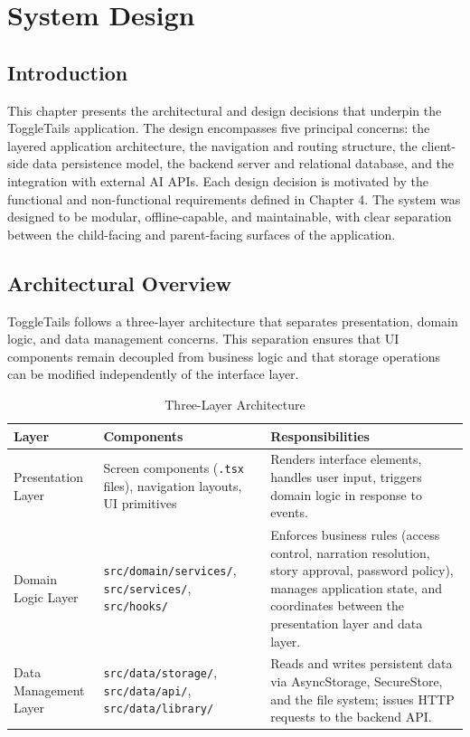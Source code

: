 \chapter{System Design}

\section{Introduction}

This chapter presents the architectural and design decisions that underpin the ToggleTails application. The design encompasses five principal concerns: the layered application architecture, the navigation and routing structure, the client-side data persistence model, the backend server and relational database, and the integration with external AI APIs. Each design decision is motivated by the functional and non-functional requirements defined in Chapter 4. The system was designed to be modular, offline-capable, and maintainable, with clear separation between the child-facing and parent-facing surfaces of the application.

\section{Architectural Overview}

ToggleTails follows a three-layer architecture that separates presentation, domain logic, and data management concerns. This separation ensures that UI components remain decoupled from business logic and that storage operations can be modified independently of the interface layer.

\begin{table}[H]
\centering
\caption{Three-Layer Architecture}
\label{tab:architecture_layers}
\renewcommand{\arraystretch}{1.4}
\begin{tabularx}{\textwidth}{|>{\RaggedRight\arraybackslash}p{3.5cm}|>{\RaggedRight\arraybackslash}p{4cm}|>{\RaggedRight\arraybackslash}X|}
\hline
\textbf{Layer} & \textbf{Components} & \textbf{Responsibilities} \\
\hline
Presentation Layer & Screen components (\texttt{.tsx} files), navigation layouts, UI primitives & Renders interface elements, handles user input, triggers domain logic in response to events. \\
\hline
Domain Logic Layer & \texttt{src/domain/services/}, \texttt{src/services/}, \texttt{src/hooks/} & Enforces business rules (access control, narration resolution, story approval, password policy), manages application state, and coordinates between the presentation layer and data layer. \\
\hline
Data Management Layer & \texttt{src/data/storage/}, \texttt{src/data/api/}, \texttt{src/data/library/} & Reads and writes persistent data via AsyncStorage, SecureStore, and the file system; issues HTTP requests to the backend API. \\
\hline
\end{tabularx}
\end{table}

